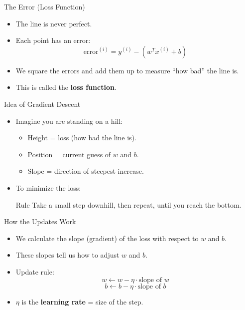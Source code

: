 \documentclass[../../main.tex]{subfiles}
\begin{document}
\begin{frame}{The Error (Loss Function)}
\begin{itemize}
    \item The line is never perfect.
    \item Each point has an error:
    \[
    \text{error}^{(i)} = y^{(i)} - (w^T x^{(i)} + b)
    \]
    \item We square the errors and add them up to measure “how bad” the line is.
    \item This is called the \textbf{loss function}.
\end{itemize}
\end{frame}

\begin{frame}{Idea of Gradient Descent}
\begin{itemize}
    \item Imagine you are standing on a hill:
    \begin{itemize}
        \item Height = loss (how bad the line is).
        \item Position = current guess of $w$ and $b$.
        \item Slope = direction of steepest increase.
    \end{itemize}
    \item To minimize the loss:
    \begin{block}{Rule}
    Take a small step downhill, then repeat, until you reach the bottom.
    \end{block}
\end{itemize}
\end{frame}

\begin{frame}{How the Updates Work}
\begin{itemize}
    \item We calculate the slope (gradient) of the loss with respect to $w$ and $b$.
    \item These slopes tell us how to adjust $w$ and $b$.
    \item Update rule:
    \[
    w \leftarrow w - \eta \cdot \text{slope of } w
    \]
    \[
    b \leftarrow b - \eta \cdot \text{slope of } b
    \]
    \item $\eta$ is the \textbf{learning rate} = size of the step.
\end{itemize}
\end{frame}
\end{document}
